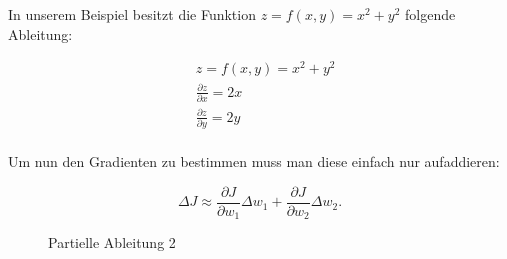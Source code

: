 \begin{minipage}{\linewidth}
In unserem Beispiel besitzt die Funktion ${ z = f(x, y) = x^2 + y^2 }$ folgende Ableitung: 

\begin{equation}
\begin{aligned}
& z = f(x, y) = x^2 + y^2 \\
& \frac{\partial z}{\partial x} = 2x \\
& \frac{\partial z}{\partial y} = 2y \\
\end{aligned}
\end{equation}

\end{minipage}

Um nun den Gradienten zu bestimmen muss man diese einfach nur aufaddieren: 

\begin{equation}
  \Delta J \approx \frac{\partial J}{\partial w_1} \Delta w_1 +
  \frac{\partial J}{\partial w_2} \Delta w_2.
\end{equation}

\begin{figure}%
  \centering
  \qquad
  \caption{Partielle Ableitung 2}
  \label{fig:partAbl2}
\end{figure}


